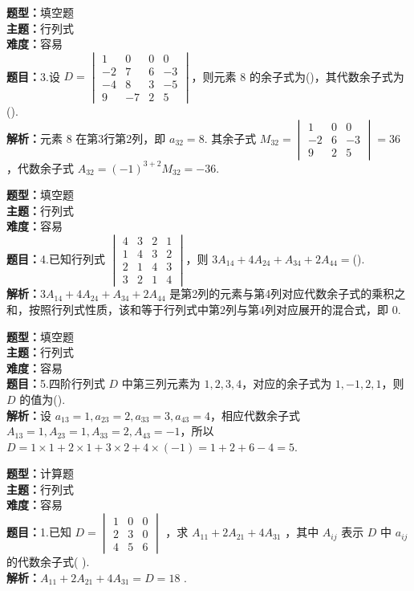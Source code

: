 \documentclass{ctexart}
\newenvironment{question}[5]{%
	\noindent\textbf{题型：}#1\\
	\textbf{主题：}#2\\
	\textbf{难度：}#3\\
	\textbf{题目：}#4\\
	\textbf{解析：}#5\\
	\vspace{1em}
}{}
\begin{document}
	\begin{question}
		{填空题}
		{行列式}
		{容易}
		{3.设 \(D=\begin{vmatrix}1 & 0 & 0 & 0 \\ -2 & 7 & 6 & -3 \\ -4 & 8 & 3 & -5 \\ 9 & -7 & 2 & 5\end{vmatrix}\)，则元素 8 的余子式为(\qquad)，其代数余子式为(\qquad). }
		{元素 8 在第3行第2列，即 \(a_{32}=8\). 其余子式 \(M_{32} = \begin{vmatrix}1 & 0 & 0 \\ -2 & 6 & -3 \\ 9 & 2 & 5\end{vmatrix} = 36\)，代数余子式 \(A_{32} = (-1)^{3+2} M_{32} = -36\). }
	\end{question}
	
	\begin{question}
		{填空题}
		{行列式}
		{容易}
		{4.已知行列式 \(\begin{vmatrix}4 & 3 & 2 & 1 \\ 1 & 4 & 3 & 2 \\ 2 & 1 & 4 & 3 \\ 3 & 2 & 1 & 4\end{vmatrix}\)，则 \(3A_{14}+4A_{24}+A_{34}+2A_{44}=\)(\qquad). }
		{\(3A_{14}+4A_{24}+A_{34}+2A_{44}\) 是第2列的元素与第4列对应代数余子式的乘积之和，按照行列式性质，该和等于行列式中第2列与第4列对应展开的混合式，即 \(0\). }
	\end{question}
	
	\begin{question}
		{填空题}
		{行列式}
		{容易}
		{5.四阶行列式 \(D\) 中第三列元素为 \(1,2,3,4\)，对应的余子式为 \(1,-1,2,1\)，则 \(D\) 的值为(\qquad). }
		{设 \(a_{13}=1, a_{23}=2, a_{33}=3, a_{43}=4\)，相应代数余子式 \(A_{13}=1, A_{23}=1, A_{33}=2, A_{43}=-1\)，所以 \(D=1\times1 + 2\times1 + 3\times2 + 4\times(-1) = 1+2+6-4=5\). }
	\end{question}
	
	\begin{question}
		{计算题}
		{行列式}
		{容易}
		{1.已知 \(D=\begin{vmatrix}1 & 0 & 0 \\ 2 & 3 & 0 \\ 4 & 5 & 6\end{vmatrix}\) ，求 \(A_{11}+2 A_{21}+4 A_{31}\) ，其中 \(A_{i j}\) 表示 \(D\) 中 \(a_{i j}\) 的代数余子式(  ).}
		{\(A_{11}+2 A_{21}+4 A_{31}=D=18\) .}
	\end{question}
	
\end{document}
